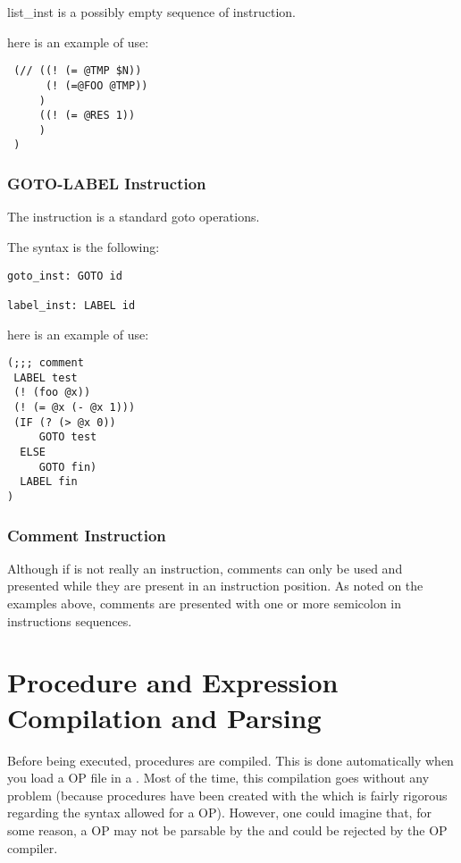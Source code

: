 list\_inst is a possibly empty sequence of instruction.

here is an example of use:
\begin{verbatim}
 (// ((! (= @TMP $N))
      (! (=@FOO @TMP))
     )
     ((! (= @RES 1))
     )
 )
\end{verbatim}

\subsubsection{GOTO-LABEL Instruction}


The  instruction is a standard goto operations.

The syntax is the following:
\begin{verbatim}
goto_inst: GOTO id

label_inst: LABEL id
\end{verbatim}

here is an example of use:
\begin{verbatim}
(;;; comment
 LABEL test
 (! (foo @x))
 (! (= @x (- @x 1)))
 (IF (? (> @x 0))
     GOTO test
  ELSE
     GOTO fin)
  LABEL fin
)
\end{verbatim}

\subsubsection{Comment Instruction}

Although if is not really an instruction, comments can only be used and
presented while they are present in an instruction position. As noted on the
examples above, comments are presented with one or more semicolon \samp{;} in
instructions sequences.

\section{Procedure and Expression Compilation and Parsing}

Before being executed, procedures are compiled. This is done
automatically when you load a OP file in a \CPK{}. Most of the time, this
compilation goes without any problem (because procedures have been
created with the \OPE{} which is fairly rigorous regarding the syntax
allowed for a OP). However, one could imagine that, for some reason, a OP
may not be parsable by the \CPK{} and could be rejected by the OP compiler.

